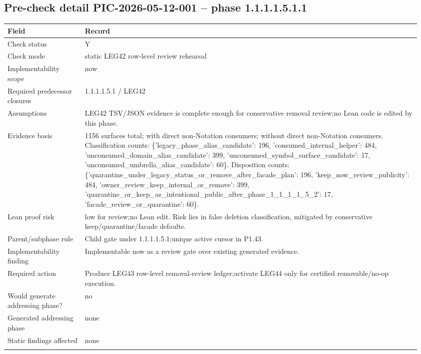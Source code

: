 \subsection*{Pre-check detail PIC-2026-05-12-001 -- phase 1.1.1.1.5.1.1}
\begin{longtable}{L{0.18\linewidth} L{0.78\linewidth}}
\hline
\textbf{Field} & \textbf{Record}\\
\hline
Check status & Y\\
\hline\addlinespace[0.20em]
Check mode & static LEG42 row-level review rehearsal\\
\hline\addlinespace[0.20em]
Implementability scope & now\\
\hline\addlinespace[0.20em]
Required predecessor closures & 1.1.1.1.5.1 /\allowbreak{} LEG42\\
\hline\addlinespace[0.20em]
Assumptions & LEG42 TSV/\allowbreak{}JSON evidence is complete enough for conservative removal review;\newline no Lean code is edited by this phase.\\
\hline\addlinespace[0.20em]
Evidence basis & 1156 surfaces total; with direct non-Notation consumers; without direct non-Notation consumers. Classification counts: \{'legacy\_phase\_alias\_candidate': 196, 'consumed\_internal\_helper': 484, 'unconsumed\_domain\_alias\_candidate': 399, 'unconsumed\_symbol\_surface\_candidate': 17, 'unconsumed\_umbrella\_alias\_candidate': 60\}. Disposition counts: \{'quarantine\_under\_legacy\_status\_or\_remove\_after\_facade\_plan': 196, 'keep\_now\_review\_publicity': 484, 'owner\_review\_keep\_internal\_or\_remove': 399, 'quarantine\_or\_keep\_as\_intentional\_public\_after\_phase\_1\_1\_1\_1\_5\_2': 17, 'facade\_review\_or\_quarantine': 60\}.\\
\hline\addlinespace[0.20em]
Lean proof risk & low for review;\newline no Lean edit. Risk lies in false deletion classification, mitigated by conservative keep/\allowbreak{}quarantine/\allowbreak{}facade defaults.\\
\hline\addlinespace[0.20em]
Parent/\allowbreak{}subphase rule & Child gate under 1.1.1.1.5.1;\newline unique active cursor in P1.43.\\
\hline\addlinespace[0.20em]
Implementability finding & Implementable now as a review gate over existing generated evidence.\\
\hline\addlinespace[0.20em]
Required action & Produce LEG43 row-level removal-review ledger;\newline activate LEG44 only for certified removable/\allowbreak{}no-op execution.\\
\hline\addlinespace[0.20em]
Would generate addressing phase? & no\\
\hline\addlinespace[0.20em]
Generated addressing phase & none\\
\hline\addlinespace[0.20em]
Static findings affected & none\\
\hline\addlinespace[0.20em]
\end{longtable}
